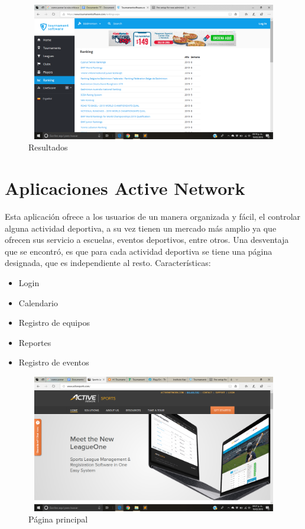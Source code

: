 \pagebreak
\begin{figure}[h]
	\centering
	\includegraphics[width=12cm, height=6cm]{Imagenes/Aplicaciones/Tos3.png}
	\caption{Resultados}
\end{figure}

\section{Aplicaciones Active Network}
\noindent Esta aplicación ofrece a los usuarios de un manera organizada y fácil, el controlar alguna actividad deportiva, a su vez tienen un mercado más amplio ya que ofrecen sus servicio a escuelas, eventos deportivos, entre otros. Una desventaja que se encontró, es que para cada actividad deportiva se tiene una página designada, que es independiente al resto. \cite{act}
Características: 
\begin{itemize}
	\item Login
	\item Calendario
	\item Registro de equipos
	\item Reportes
	\item Registro de eventos
\end{itemize}
\begin{figure}[ht]
	\centering
	\includegraphics[width=12cm, height=6cm]{Imagenes/Aplicaciones/AN1.png}
	\caption{Página principal}
\end{figure}

